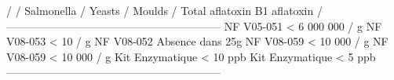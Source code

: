 /   \newline / Salmonella \newline / Yeasts \newline / Moulds \newline / Total aflatoxin \newline B1 aflatoxin \newline /  \newline ----------------------------------------------------------- \newline NF V05-051 < 6 000 000 / g \newline NF V08-053 < 10 / g \newline NF V08-052 Absence dans 25g \newline NF V08-059 < 10 000 / g \newline NF V08-059 < 10 000 / g \newline Kit Enzymatique < 10 ppb \newline Kit Enzymatique < 5 ppb \newline ----------------------------------------------------------- \newline 